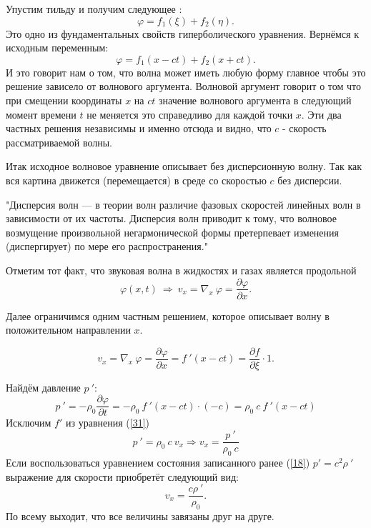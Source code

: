 \documentclass[14pt,a4paper,oneside]{extarticle}	%
\begin{document}
Упустим тильду и получим следующее :
\begin{equation}\label{28}
\varphi = f_{1}(\xi) + f_{2}(\eta).
\end{equation}
Это одно из фундаментальных свойств гиперболического уравнения.
Вернёмся к исходным переменным:
\begin{equation}\label{29}
\varphi = f_{1}(x-ct) + f_{2}(x+ct).
\end{equation}
И это говорит нам о том, что волна может иметь любую форму главное чтобы это решение зависело от волнового аргумента.
Волновой аргумент говорит о том что при смещении координаты $ x $ на $ ct $ значение волнового аргумента в следующий момент времени $ t $ не меняется это справедливо для каждой точки $ x $.
Эти два частных решения независимы и именно отсюда и видно, что $ c $ - скорость рассматриваемой волны.

Итак исходное волновое уравнение описывает без дисперсионную волну. Так как вся картина движется (перемещается) в среде со скоростью $ c $ без дисперсии.
 
"Дисперсия волн — в теории волн различие фазовых скоростей линейных волн в зависимости от их частоты. Дисперсия волн приводит к тому, что волновое возмущение произвольной негармонической формы претерпевает изменения (диспергирует) по мере его распространения."

Отметим тот факт, что звуковая волна в жидкостях и газах является продольной 
\begin{equation}\label{30}
\varphi(x,t) \: \Rightarrow \: v_{x}=\nabla_{x}\: \varphi = \frac{\partial \varphi}{\partial x}.
\end{equation}

Далее ограничимся одним частным решением, которое описывает волну в положительном направлении $ x $.

\begin{equation}\label{31}
 v_{x}=\nabla_{x}\: \varphi = \frac{\partial \varphi}{\partial x}= f\:'(x-ct) = \frac{\partial f}{\partial \xi} \cdot 1.
\end{equation}

Найдём давление $p\:'$:
\begin{equation}\label{32}
p\:' = - \rho_{0} \frac{\partial \varphi}{\partial t} =  - \rho_{0} \:f\:'(x-ct)\cdot(-c) = \rho_{0}\:c \:f\:'(x-ct)
\end{equation}
Исключим $ f' $ из уравнения (\ref{31})
\begin{equation}\label{33}
p\:' = \rho_{0}\:c \: v_{x} \Rightarrow  v_{x} = \frac{p\:'}{\rho_{0}\:c}
\end{equation}
Если воспользоваться уравнением состояния записанного ранее (\ref{18}) $ p' = c^{2}  \rho\:' $ выражение для скорости приобретёт следующий вид:
\begin{equation}\label{34}
v_{x}= \frac{c \rho\:'}{\rho_{0}}.
\end{equation}
По всему выходит, что все величины завязаны друг на друге.
\end{document}
